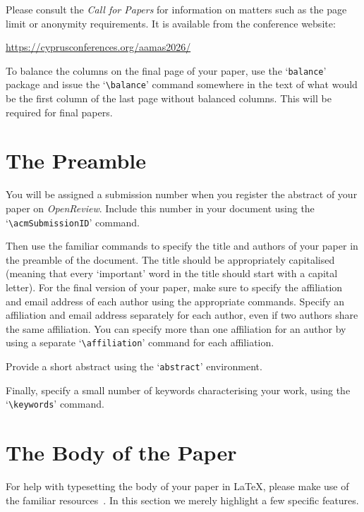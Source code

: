 \documentclass[sigconf,anonymous]{aamas}
\begin{document}
Please consult the \emph{Call for Papers} for information on matters 
such as the page limit or anonymity requirements. It is available from
the conference website:
%
\begin{center}
\url{https://cyprusconferences.org/aamas2026/}
\end{center}
%
To balance the columns on the final page of your paper, use the 
`\texttt{balance}' package and issue the `\verb|\balance|' command
 somewhere in the text of what would be the first column of the last 
 page without balanced columns. This will be required for final papers.


\section{The Preamble}

You will be assigned a submission number when you register the abstract 
of your paper on \textit{OpenReview}. Include this number in your 
document using the `\verb|\acmSubmissionID|' command.

Then use the familiar commands to specify the title and authors of your
paper in the preamble of the document. The title should be appropriately 
capitalised (meaning that every `important' word in the title should 
start with a capital letter). For the final version of your paper, make 
sure to specify the affiliation and email address of each author using 
the appropriate commands. Specify an affiliation and email address 
separately for each author, even if two authors share the same 
affiliation. You can specify more than one affiliation for an author by 
using a separate `\verb|\affiliation|' command for each affiliation.

Provide a short abstract using the `\texttt{abstract}' environment.
 
Finally, specify a small number of keywords characterising your work, 
using the `\verb|\keywords|' command. 


\section{The Body of the Paper}

For help with typesetting the body of your paper in \LaTeX\@, please 
make use of the familiar resources~\cite{Lam94}. In this section we 
merely highlight a few specific features. 
\end{document}
